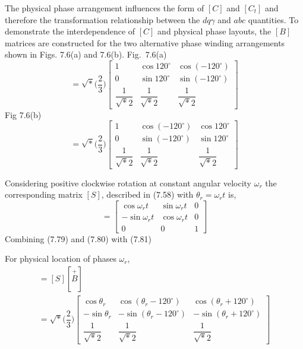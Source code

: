 \documentclass[a4paper,numbers=noenddot,12pt]{scrbook}
\begin{document}
    The physical phase arrangement influences the form of $[C]$ and $[C_t]$ and therefore the transformation relationship between the $d q \gamma$ and $abc$ quantities. To demonstrate the interdependence of $[C]$ and physical phase layouts, the $[B]$ matrices are constructed for the two alternative phase winding arrangements shown in Figs. 7.6(a) and 7.6(b).
    Fig.\ 7.6(a)
    \begin{equation}
        [\overset{+}{B}] = \sqrt*{\Big(\dfrac{2}{3} \Big)}
        \begin{bmatrix}
            1 & \cos 120^{\circ} & \cos (-120^{\circ}) \\
            0 & \sin 120^{\circ} & \sin (-120^{\circ}) \\
            \dfrac{1}{\sqrt*{2}} & \dfrac{1}{\sqrt*{2}} & \dfrac{1}{\sqrt*{2}}
        \end{bmatrix}
        \label{eq:Eq7.79}
    \end{equation}
    Fig 7.6(b)
    \begin{equation}
        [\overset{-}{B}] = \sqrt*{\Big(\dfrac{2}{3} \Big)}
        \begin{bmatrix}
            1 & \cos (- 120^{\circ}) & \cos 120^{\circ} \\
            0 & \sin (- 120^{\circ}) & \sin 120^{\circ} \\
            \dfrac{1}{\sqrt*{2}} & \dfrac{1}{\sqrt*{2}} & \dfrac{1}{\sqrt*{2}}
        \end{bmatrix}
        \label{eq:Eq7.80}
    \end{equation}

    Considering positive clockwise rotation at constant angular velocity $\omega_r$ the corresponding matrix $[S]$, described in (7.58) with  $\theta_r = \omega_r t$ is,
    \begin{equation}
        [S] = 
        \begin{bmatrix}
            \cos \omega_r t & \sin \omega_r t & 0 \\
            - \sin \omega_r t  & \cos \omega_r t & 0 \\
            0 & 0 & 1
        \end{bmatrix}
        \label{eq:Eq7.81}
    \end{equation}
    Combining (7.79) and (7.80) with (7.81)

    For physical location of phases $\omega_r$,
    \begin{multline}
        [\overset{+}{C}] = [S] [\overset{+}{B}] \\
        = \sqrt*{\Big( \dfrac{2}{3} \Big)}
        \begin{bmatrix}
            \cos \theta_r & \cos (\theta_r - 120^{\circ}) & \cos (\theta_r + 120^{\circ}) \\
            - \sin \theta_r & - \sin (\theta_r - 120^{\circ}) & - \sin (\theta_r + 120^{\circ}) \\
            \dfrac{1}{\sqrt*{2}} & \dfrac{1}{\sqrt*{2}} & \dfrac{1}{\sqrt*{2}}
        \end{bmatrix}
        \label{eq:Eq7.82}
    \end{multline}
\end{document}
